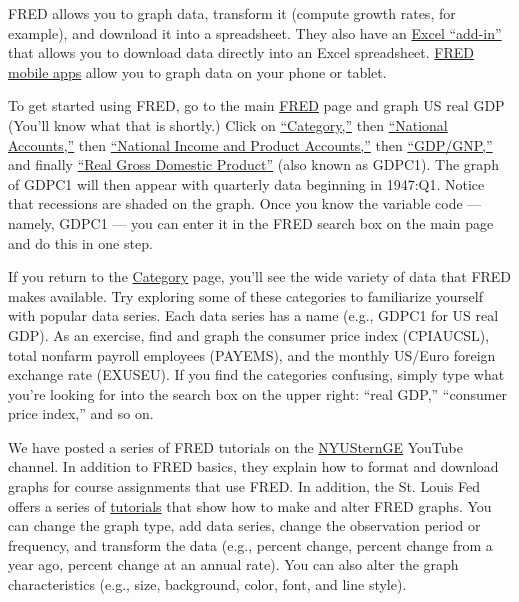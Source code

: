 FRED  allows you to graph data, transform it (compute growth rates, for example),
 and download it into a spreadsheet.
They also have an \href{http://research.stlouisfed.org/fred-addin/}{Excel ``add-in''}
that allows you to download data directly into an Excel spreadsheet.
\href{http://research.stlouisfed.org/fred-mobile/}{FRED mobile apps} allow
you to graph data on your phone or tablet.

To get started using FRED, go to the main \href{http://research.stlouisfed.org/fred2}{FRED} page
and graph US real GDP
(You'll know what that is shortly.)
Click on \href{http://research.stlouisfed.org/fred2/categories}{``Category,''} then \href{http://research.stlouisfed.org/fred2/categories/32992}{``National Accounts,''} then \href{http://research.stlouisfed.org/fred2/categories/18}{``National Income and Product Accounts,''} then \href{http://research.stlouisfed.org/fred2/categories/106}{``GDP/GNP,''} and finally \href{http://research.stlouisfed.org/fred2/series/GDPC1?cid=106}{``Real Gross Domestic Product''}
(also known as GDPC1). The graph of GDPC1 will then appear with quarterly data beginning in 1947:Q1. Notice that recessions are shaded on the graph.
Once you know the variable code --- namely, GDPC1 --- you can enter it in the FRED search box
on the main page and do this in one step.

If you return to the \href{http://research.stlouisfed.org/fred2/categories}{Category} page,
you'll see the wide variety of data that FRED makes available.
Try exploring some of these categories to familiarize yourself with popular data series.
Each data series has a name (e.g., GDPC1 for US real GDP). As an exercise, find and graph the consumer price index 
 (CPIAUCSL), total nonfarm payroll employees (PAYEMS), and the monthly US/Euro foreign exchange rate (EXUSEU).
If you find the categories confusing, simply type what you're looking for into the search box
on the upper right:  ``real GDP,'' ``consumer price index,'' and so on.

We have posted a series of FRED tutorials on the
\href{http://www.youtube.com/user/NYUSternGE}{NYUSternGE}
YouTube channel.
In addition to FRED basics, they explain how to format and download graphs for course
assignments that use FRED.
In addition, the St. Louis Fed offers
a series of \href{http://research.stlouisfed.org/tutorials/fredgraph/}{tutorials}
that show how to make and alter FRED graphs.
You can change the graph type, add data series, change the observation period or frequency, and transform the data (e.g., percent change, percent change from a year ago, percent change at an annual rate). You can also alter the graph characteristics (e.g., size, background, color, font, and line style).

